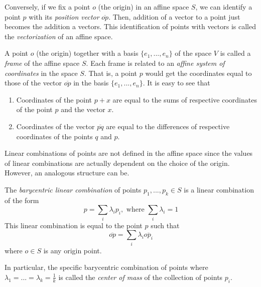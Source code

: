 \documentclass{article}
\begin{document}
    \begin{definition}
      Conversely, if we fix a point $o$ (the origin) in an affine space $S$, we can identify a point $p$ with its \textit{position vector} $\overline{op}$. Then, addition of a vector to a point just becomes the addition a vectors. This identification of points with vectors is called the \textit{vectorization} of an affine space. 
    \end{definition}

    \begin{definition}
      A point $o$ (the origin) together with a basis $\{e_1, ..., e_n\}$ of the space $V$ is called a \textit{frame} of the affine space $S$. Each frame is related to an \textit{affine system of coordinates} in the space $S$. That is, a point $p$ would get the coordinates equal to those of the vector $\overline{op}$ in the basis $\{e_1, ..., e_n\}$. It is easy to see that 
      \begin{enumerate}
        \item Coordinates of the point $p+x$ are equal to the sums of respective coordinates of the point $p$ and the vector $x$. 
        \item Coordinates of the vector $\overline{pq}$ are equal to the differences of respective coordinates of the points $q$ and $p$. 
      \end{enumerate}
    \end{definition}

    Linear combinations of points are not defined in the affine space since the values of linear combinations are actually dependent on the choice of the origin. However, an analogous structure can be. 

    \begin{definition}
      The \textit{barycentric linear combination} of points $p_1, ..., p_k \in S$ is a linear combination of the form
      \begin{equation}
        p = \sum_i \lambda_i p_i, \text{ where } \sum_i \lambda_i = 1
      \end{equation}
      This linear combination is equal to the point $p$ such that
      \begin{equation}
        \overline{op} = \sum_i \lambda_i \overline{op_i}
      \end{equation}
      where $o \in S$ is any origin point.
    \end{definition}

    \begin{definition}
      In particular, the specific barycentric combination of points where $\lambda_1 = ... = \lambda_k = \frac{1}{k}$ is called the \textit{center of mass} of the collection of points $p_i$. 
    \end{definition}
\end{document}
